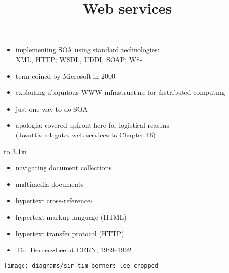 \documentclass{sepslide-soa-faked} %
\title{Web services}
\begin{document}
\begin{slide}
  \Title
\end{slide}

\begin{slide}
  \Contents
\end{slide}

\begin{slide}
\begin{itemize}
\item implementing SOA using standard technologies: \\
  XML, HTTP; WSDL, UDDI, SOAP; WS-\maths{\ast}
\item term coined by Microsoft in 2000
\item exploiting ubiquitous WWW infrastructure for distributed computing
\item just one way to do SOA
\item apologia: covered upfront here for logistical reasons \\
(Josuttis relegates web services to Chapter 16)
\end{itemize}
\end{slide}

\begin{slide}
\begin{minipage}{0.5\textwidth}\raggedright
\vbox to 3.1in{
\begin{itemize}
\item navigating document collections
\item multimedia documents
\item hypertext cross-references
\item hypertext markup language (HTML)
\item hypertext transfer protocol (HTTP)
\item Tim Berners-Lee at CERN, 1989--1992
\end{itemize}
\vfil}
\end{minipage}
\hfil
\begin{minipage}{0.4\textwidth}\begin{flushright}%
\texttt{[image: diagrams/sir\_tim\_berners-lee\_cropped]}%
\end{flushright}\end{minipage}%
\end{slide}
\end{document}
